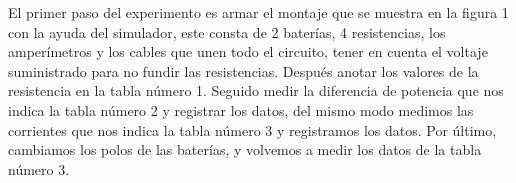 \documentclass[letterpaper, 12pt]{article}
\begin{document}
\begin{multicols}{2}
	El primer paso del experimento es armar el montaje que se muestra en la
	figura 1 con la ayuda del simulador, este consta de 2 baterías, 4
	resistencias, los amperímetros y los cables que unen todo el circuito,
	tener en cuenta el voltaje suministrado para no fundir las resistencias.
	Después anotar los valores de la resistencia en la tabla número 1.
	Seguido medir la diferencia de potencia que nos indica la tabla número 2
	y registrar los datos, del mismo modo medimos las corrientes que nos
	indica la tabla número 3 y registramos los datos. Por último, cambiamos
	los polos de las baterías, y volvemos a medir los datos de la tabla
	número 3.

\end{multicols}

\newpage


\end{document}

